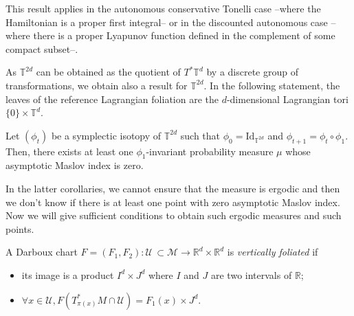 \documentclass[AHL, Unicode, longabstracts, published]{cedram}
\newcommand*\cU{\mathcal{U}}
\newcommand*\cal{\mathcal}
\newcommand{\rId}{\mathrm{Id}}
\newcommand*\R{\mathbb{R}}
\newcommand*\T{\mathbb{T}}
\let\oldforall\forall
\renewcommand*{\forall}{\mathrel{\oldforall}}
\begin{document}
This result applies in the autonomous conservative Tonelli case --where the Hamiltonian is a proper first integral-- or in the discounted autonomous case --where there is a proper Lyapunov function defined in the complement of some compact subset--.

As $\T^{2d}$ can be obtained as the quotient of $T^*\T^d$ by a discrete group of transformations, we obtain also a result for $\T^{2d}$. In the following statement, { the leaves of the reference Lagrangian foliation are the $d$-dimensional Lagrangian tori $\{0\}\times \T^d$. }

\begin{coro}\label{measuretorus}
Let $(\phi_t) $ be a symplectic isotopy of $\T^{2d}$ such that $\phi_0=\rId_{\T^{2d}}$ and $\phi_{t+1}=\phi_t\circ\phi_1$. Then, there exists at least one $\phi_1$-invariant probability measure $\mu$ whose asymptotic Maslov index is zero.
\end{coro}

In the latter corollaries, we cannot ensure that the measure is ergodic and then we don't know if there is at least one point with zero asymptotic Maslov index. Now we will give sufficient conditions to obtain such ergodic measures and such points.

 
\begin{defi}
A Darboux chart $F=(F_1, F_2):\cU{ \,\subset\cal M} \rightarrow \R^d\times \R^d$ is \emph{vertically foliated} if
\begin{itemize}
\item its image is a product $I^d\times J^d$ where $I$ and $J$ are two intervals of $\R$;
\item $\forall x\in \cU, F(T^*_{\pi(x)}M\cap \cU)=F_1(x)\times J^d$.
\end{itemize}
\end{defi}
\end{document}
